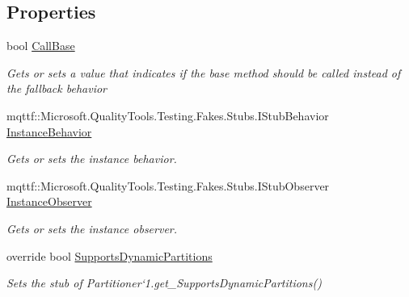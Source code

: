 \subsection*{Properties}
\begin{DoxyCompactItemize}
\item 
bool \hyperlink{class_system_1_1_collections_1_1_concurrent_1_1_fakes_1_1_stub_partitioner_3_01_t_source_01_4_ab9f54a2d34444d85d01590c3f0d2d53c}{Call\-Base}
\begin{DoxyCompactList}\small\item\em Gets or sets a value that indicates if the base method should be called instead of the fallback behavior\end{DoxyCompactList}\item 
mqttf\-::\-Microsoft.\-Quality\-Tools.\-Testing.\-Fakes.\-Stubs.\-I\-Stub\-Behavior \hyperlink{class_system_1_1_collections_1_1_concurrent_1_1_fakes_1_1_stub_partitioner_3_01_t_source_01_4_aab9dbd3090915d14014359dcee5cf643}{Instance\-Behavior}
\begin{DoxyCompactList}\small\item\em Gets or sets the instance behavior.\end{DoxyCompactList}\item 
mqttf\-::\-Microsoft.\-Quality\-Tools.\-Testing.\-Fakes.\-Stubs.\-I\-Stub\-Observer \hyperlink{class_system_1_1_collections_1_1_concurrent_1_1_fakes_1_1_stub_partitioner_3_01_t_source_01_4_a855f055bcf26dd30cdc27b1011cb240e}{Instance\-Observer}
\begin{DoxyCompactList}\small\item\em Gets or sets the instance observer.\end{DoxyCompactList}\item 
override bool \hyperlink{class_system_1_1_collections_1_1_concurrent_1_1_fakes_1_1_stub_partitioner_3_01_t_source_01_4_ac2c253c6e3817c072674cf261eaffe99}{Supports\-Dynamic\-Partitions}
\begin{DoxyCompactList}\small\item\em Sets the stub of Partitioner`1.get\-\_\-\-Supports\-Dynamic\-Partitions()\end{DoxyCompactList}\end{DoxyCompactItemize}


